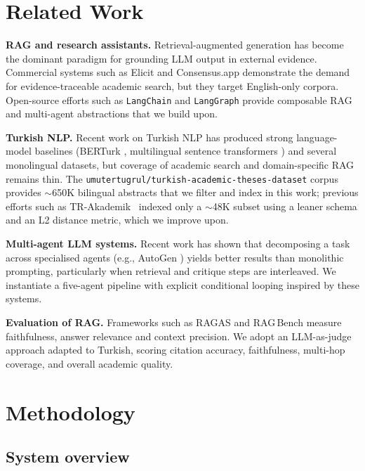 \documentclass[conference]{IEEEtran}
\begin{document}
\section{Related Work}

\textbf{RAG and research assistants.} Retrieval-augmented generation
\cite{lewis2020rag} has become the dominant paradigm for grounding LLM
output in external evidence. Commercial systems such as Elicit and
Consensus.app demonstrate the demand for evidence-traceable academic search,
but they target English-only corpora. Open-source efforts such as
\texttt{LangChain} and \texttt{LangGraph} \cite{langchain2024,langgraph2024}
provide composable RAG and multi-agent abstractions that we build upon.

\textbf{Turkish NLP.} Recent work on Turkish NLP has produced strong
language-model baselines (BERTurk \cite{schweter2020berturk}, multilingual
sentence transformers \cite{reimers2019sbert,reimers2020multilingualsbert})
and several monolingual datasets, but coverage of academic search and
domain-specific RAG remains thin. The
\texttt{umutertugrul/turkish-academic-theses-dataset} corpus
\cite{umut2024theses} provides $\sim$650K bilingual abstracts that we filter
and index in this work; previous efforts such as TR-Akademik~\cite{trakad2025}
indexed only a $\sim$48K subset using a leaner schema and an L2 distance
metric, which we improve upon.

\textbf{Multi-agent LLM systems.} Recent work has shown that decomposing a
task across specialised agents (e.g., AutoGen \cite{wu2023autogen}) yields
better results than monolithic prompting, particularly when retrieval and
critique steps are interleaved. We instantiate a five-agent pipeline with
explicit conditional looping inspired by these systems.

\textbf{Evaluation of RAG.} Frameworks such as RAGAS \cite{es2024ragas} and
RAG\,Bench \cite{lyu2024rag} measure faithfulness, answer relevance and
context precision. We adopt an LLM-as-judge approach \cite{zheng2023llmjudge}
adapted to Turkish, scoring citation accuracy, faithfulness, multi-hop
coverage, and overall academic quality.

\section{Methodology}

\subsection{System overview}
\end{document}
